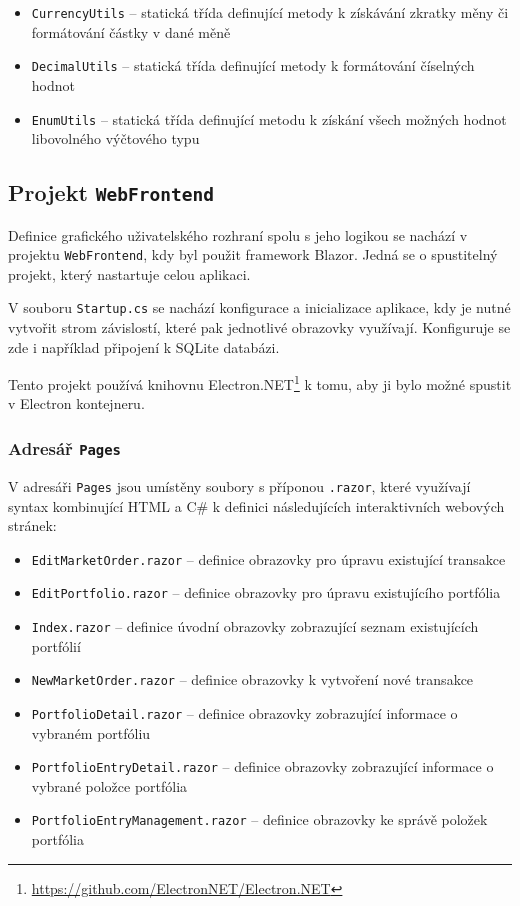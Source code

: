 \documentclass[12pt, a4paper]{article}
\begin{document}
    \begin{itemize}
        \item \texttt{CurrencyUtils} -- statická třída definující metody k získávání zkratky měny či formátování částky v dané měně
        \item \texttt{DecimalUtils} -- statická třída definující metody k formátování číselných hodnot
        \item \texttt{EnumUtils} -- statická třída definující metodu k získání všech možných hodnot libovolného výčtového typu
    \end{itemize}
    
    \subsection{Projekt \texttt{WebFrontend}}
    Definice grafického uživatelského rozhraní spolu s jeho logikou se nachází v projektu \texttt{WebFrontend}, kdy byl
    použit framework Blazor.
    Jedná se o spustitelný projekt, který nastartuje celou aplikaci.
    
    V souboru \texttt{Startup.cs} se nachází konfigurace a inicializace aplikace, kdy je nutné vytvořit strom závislostí,
    které pak jednotlivé obrazovky využívají.
    Konfiguruje se zde i například připojení k SQLite databázi.
    
    Tento projekt používá knihovnu Electron.NET\footnote{\url{https://github.com/ElectronNET/Electron.NET}} k tomu, aby ji bylo možné spustit v Electron kontejneru. 
    
    \subsubsection{Adresář \texttt{Pages}} 
    V adresáři \texttt{Pages} jsou umístěny soubory s příponou \texttt{.razor}, které využívají syntax kombinující HTML
    a C\# k definici následujících interaktivních webových stránek:
    
    \begin{itemize}
        \item \texttt{EditMarketOrder.razor} -- definice obrazovky pro úpravu existující transakce
        \item \texttt{EditPortfolio.razor} -- definice obrazovky pro úpravu existujícího portfólia
        \item \texttt{Index.razor} -- definice úvodní obrazovky zobrazující seznam existujících portfólií
        \item \texttt{NewMarketOrder.razor} -- definice obrazovky k vytvoření nové transakce
        \item \texttt{PortfolioDetail.razor} -- definice obrazovky zobrazující informace o vybraném portfóliu
        \item \texttt{PortfolioEntryDetail.razor} -- definice obrazovky zobrazující informace o vybrané položce portfólia
        \item \texttt{PortfolioEntryManagement.razor} -- definice obrazovky ke správě položek portfólia
    \end{itemize}
   
\end{document}

